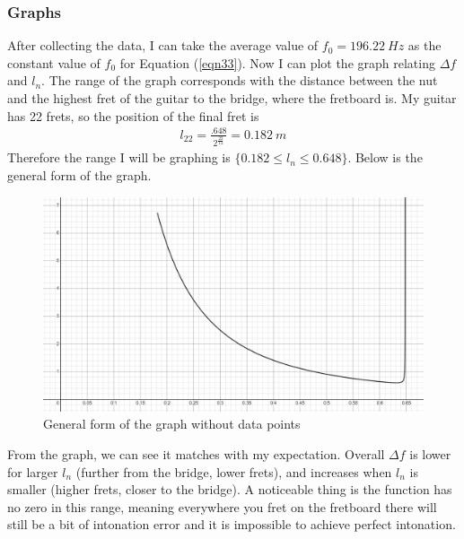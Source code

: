 \documentclass[11pt]{article}
\begin{document}
\begin{flushleft}
            \subsubsection*{Graphs}    
                After collecting the data, I can take the average value of $f_0 = \SI{196.22}{Hz}$ as the constant value of $f_0$ for Equation (\ref{eqn33}). Now I can plot the graph relating $\Delta f$ and $l_n$. The range of the graph corresponds with the distance between the nut and the highest fret of the guitar to the bridge, where the fretboard is. My guitar has 22 frets, so the position of the final fret is
                \begin{align*}
                    l_{22} = \frac{.648}{2^{\frac{22}{12}}} = \SI{0.182}{m}
                \end{align*} 
                Therefore the range I will be graphing is $\{0.182 \le l_n \le 0.648 \}$. Below is the general form of the graph.\par
                \FloatBarrier
                \begin{figure}[!ht]
                    \includegraphics[width = \textwidth]{no_data_graph.png}
                    \caption{General form of the graph without data points} \label{fig8}
                \end{figure}
                \FloatBarrier
                From the graph, we can see it matches with my expectation. Overall $\Delta f$ is lower for larger $l_n$ (further from the bridge, lower frets), and increases when $l_n$ is smaller (higher frets, closer to the bridge). A noticeable thing is the function has no zero in this range, meaning everywhere you fret on the fretboard there will still be a bit of intonation error and it is impossible to achieve perfect intonation.\par

\end{flushleft}
\end{document}
